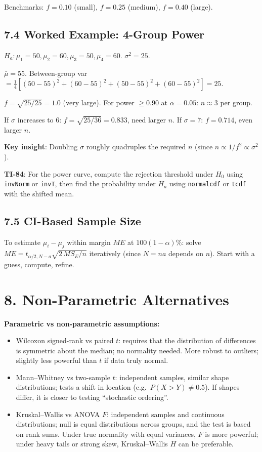 \documentclass[9pt,letterpaper]{article}
\begin{document}
Benchmarks: $f=0.10$ (small), $f=0.25$ (medium), $f=0.40$ (large).

\subsection{7.4 Worked Example: 4-Group Power}

$H_a: \mu_1=50, \mu_2=60, \mu_3=50, \mu_4=60$. $\sigma^2=25$.

$\bar\mu = 55$. Between-group var $= \frac{1}{4}[(50-55)^2+(60-55)^2+(50-55)^2+(60-55)^2] = 25$.

$f = \sqrt{25/25} = 1.0$ (very large). For power $\ge 0.90$ at $\alpha=0.05$: $n \approx 3$ per group.

If $\sigma$ increases to 6: $f = \sqrt{25/36} = 0.833$, need larger $n$. If $\sigma=7$: $f=0.714$, even larger $n$.

\textbf{Key insight}: Doubling $\sigma$ roughly quadruples the required $n$ (since $n \propto 1/f^2 \propto \sigma^2$).

\begin{calcbox}
\textbf{TI-84}: For the power curve, compute the rejection threshold under $H_0$ using \texttt{invNorm} or \texttt{invT}, then find the probability under $H_a$ using \texttt{normalcdf} or \texttt{tcdf} with the shifted mean.
\end{calcbox}

\subsection{7.5 CI-Based Sample Size}

To estimate $\mu_i-\mu_j$ within margin $ME$ at $100(1-\alpha)\%$: solve $ME = t_{\alpha/2,N-a}\sqrt{2\,MS_E/n}$ iteratively (since $N=na$ depends on $n$). Start with a guess, compute, refine.

\section{8. Non-Parametric Alternatives}

\textbf{Parametric vs non-parametric assumptions:}
\begin{itemize}
  \item Wilcoxon signed-rank vs paired $t$: requires that the distribution of differences is symmetric about the median; no normality needed. More robust to outliers; slightly less powerful than $t$ if data truly normal.
  \item Mann--Whitney vs two-sample $t$: independent samples, similar shape distributions; tests a shift in location (e.g.\ $P(X>Y)\neq 0.5$). If shapes differ, it is closer to testing ``stochastic ordering''.
  \item Kruskal--Wallis vs ANOVA $F$: independent samples and continuous distributions; null is equal distributions across groups, and the test is based on rank sums. Under true normality with equal variances, $F$ is more powerful; under heavy tails or strong skew, Kruskal--Wallis $H$ can be preferable.
\end{itemize}
\end{document}
